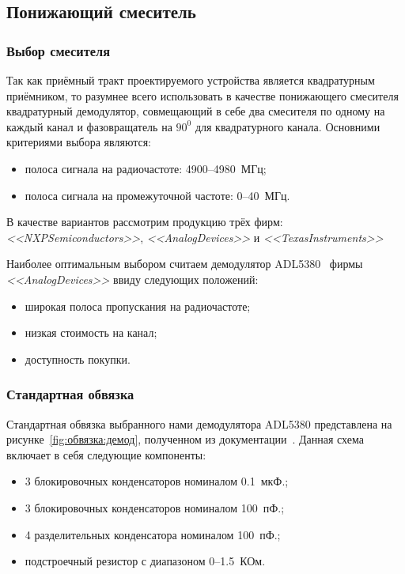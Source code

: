 \documentclass[utf8x, 14pt, oneside, a4paper]{article}
\begin{document}
		\subsection{Понижающий смеситель}
			\subsubsection{Выбор смесителя}
				Так как приёмный тракт проектируемого устройства является квадратурным приёмником, то разумнее всего использовать в качестве понижающего смесителя квадратурный демодулятор, совмещающий в себе два смесителя по одному на каждый канал и фазовращатель на $90^{0}$ для квадратурного канала. Основними критериями выбора являются:
				\begin{itemize}
					\item полоса сигнала на радиочастоте: 4900--4980~МГц;
					\item полоса сигнала на промежуточной частоте: 0--40~МГц.
				\end{itemize}
			
				В качестве вариантов рассмотрим продукцию трёх фирм: \textit{<<NXPSemiconductors>>}, \textit{<<AnalogDevices>>} и \textit{<<TexasInstruments>>}
				
				
				
				Наиболее оптимальным выбором считаем демодулятор ADL5380~\cite{bib:ПонижающийСмеситель} фирмы \textit{<<AnalogDevices>>} ввиду следующих положений:
				\begin{itemize}
					\item широкая полоса пропускания на радиочастоте;
					\item низкая стоимость на канал;
					\item доступность покупки.
				\end{itemize}
			
			\subsubsection{Стандартная обвязка}
				Стандартная обвязка выбранного нами демодулятора ADL5380 представлена на рисунке~\ref{fig:обвязка:демод}, полученном из документации~\cite{bib:ПонижающийСмеситель}. Данная схема включает в себя следующие компоненты:
				\begin{itemize}
					\item 3 блокировочных конденсаторов номиналом 0.1~мкФ.;
					\item 3 блокировочных конденсаторов номиналом 100~пФ.;
					\item 4 разделительных конденсатора номиналом 100~пФ.;
					\item подстроечный резистор с диапазоном 0--1.5~КОм.
				\end{itemize}
			
\end{document}

